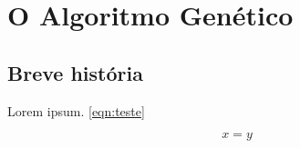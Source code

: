 
\chapter{O Algoritmo Genético}

\section{Breve história}

Lorem ipsum. \autoref{eqn:teste}

\begin{equation}
\label{eqn:teste}
x = y
\end{equation}